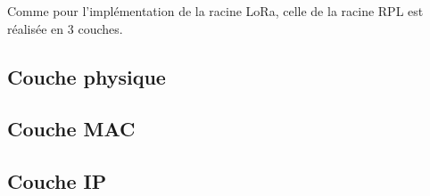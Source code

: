     Comme pour l'implémentation de la racine LoRa, celle de la racine RPL est réalisée en 3 couches.

\subsection*{Couche physique}
\subsection*{Couche MAC}
\subsection*{Couche IP}
